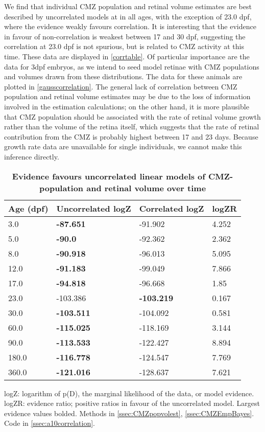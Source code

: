 We find that individual CMZ population and retinal volume estimates are best described by uncorrelated models at in all ages, with the exception of 23.0 dpf, where the evidence weakly favours correlation. It is interesting that the evidence in favour of non-correlation is weakest between 17 and 30 dpf, suggesting the correlation at 23.0 dpf is not spurious, but is related to CMZ activity at this time. These data are displayed in \autoref{corrtable}. Of particular importance are the data for 3dpf embryos, as we intend to seed model retinae with CMZ populations and volumes drawn from these distributions. The data for these animals are plotted in \autoref{gausscorrelation}. The general lack of correlation between CMZ population and retinal volume estimates may be due to the loss of information involved in the estimation calculations; on the other hand, it is more plausible that CMZ population should be associated with the rate of retinal volume growth rather than the volume of the retina itself, which suggests that the rate of retinal contribution from the CMZ is probably highest between 17 and 23 days. Because growth rate data are unavailable for single individuals, we cannot make this inference directly.

\begin{table}[!ht]
    \centering
    \caption{{\bf Evidence favours uncorrelated linear models of CMZ-population and retinal volume over time}}
    \begin{tabular}{|l|l|l|l|}
        \hline
        {\bf Age (dpf)} & {\bf Uncorrelated logZ} & {\bf Correlated logZ} & {\bf logZR}\\ \hline
        3.0 & {\bf -87.651} & -91.902 & 4.252\\ \hline
        5.0 & {\bf -90.0} & -92.362 & 2.362\\ \hline
        8.0 & {\bf -90.918} & -96.013 & 5.095\\ \hline
        12.0 & {\bf -91.183} & -99.049 & 7.866\\ \hline
        17.0 & {\bf -94.818} & -96.668 & 1.85\\ \hline
        23.0 & -103.386 & {\bf -103.219} & 0.167\\ \hline
        30.0 & {\bf -103.511} & -104.092 & 0.581\\ \hline
        60.0 & {\bf -115.025} & -118.169 & 3.144\\ \hline
        90.0 & {\bf -113.533} & -122.427 & 8.894\\ \hline
        180.0 & {\bf -116.778} & -124.547 & 7.769\\ \hline
        360.0 & {\bf -121.016} & -128.637 & 7.621\\ \hline
        \end{tabular}
    \begin{flushleft} logZ: logarithm of p(D), the marginal likelihood of the data, or model evidence. logZR: evidence ratio; positive ratios in favour of the uncorrelated model. Largest evidence values bolded.
    Methods in \autoref{ssec:CMZpopvolest}, \autoref{ssec:CMZEmpBayes}.
    Code in \autoref{ssec:a10correlation}.
    
    \end{flushleft}
    \label{corrtable}
\end{table}

